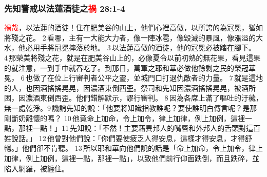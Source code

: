 \subsubsection{先知警戒以法蓮酒徒之\textcolor{red}{禍} 28:1-4}
\textcolor{red}{禍哉}，以法蓮的酒徒！住在肥美谷的山上，他們心裡高傲，以所誇的為冠冕，猶如將殘之花。 2 看哪，主有一大能大力者，像一陣冰雹，像毀滅的暴風，像漲溢的大水，他必用手將冠冕摔落於地。 3 以法蓮高傲的酒徒，他的冠冕必被踏在腳下。 4 那榮美將殘之花，就是在肥美谷山上的，必像夏令以前初熟的無花果，看見這果的就注意，一到手中就吞吃了。到那日，萬軍之耶和華必做他餘剩之民的榮冠華冕， 6 也做了在位上行審判者公平之靈，並城門口打退仇敵者的力量。 7 就是這地的人，也因酒搖搖晃晃，因濃酒東倒西歪。祭司和先知因濃酒搖搖晃晃，被酒所困，因濃酒東倒西歪。他們錯解默示，謬行審判。 8 因為各席上滿了嘔吐的汙穢，無一處乾淨。9 譏誚先知的說：「他要將知識指教誰呢？要使誰明白傳言呢？是那剛斷奶離懷的嗎？ 10 他竟命上加命，令上加令，律上加律，例上加例，這裡一點，那裡一點！」11 先知說：「不然！主要藉異邦人的嘴唇和外邦人的舌頭對這百姓說話。」 12 他曾對他們說：「你們要使疲乏人得安息，這樣才得安息，才得舒暢。」他們卻不肯聽。 13 所以耶和華向他們說的話是「命上加命，令上加令，律上加律，例上加例，這裡一點，那裡一點」，以致他們前行仰面跌倒，而且跌碎，並陷入網羅，被纏住。






